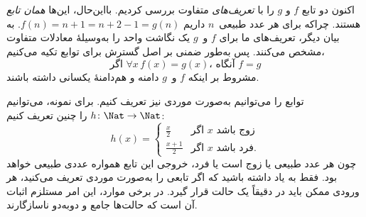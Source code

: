 \documentclass[../../../include/open-logic-section]{subfiles}
\begin{document}
\begin{explain}
اکنون دو تابع $f$ و $g$ را با \emph{تعریف‌های} متفاوت بررسی کردیم.
بااین‌حال، این‌ها \emph{همان تابع} هستند. چراکه
برای هر عدد طبیعی~$n$ داریم $f(n) = n+1 = n+2-1 =
g(n)$. به بیان دیگر، تعریف‌های ما برای $f$ و~$g$ یک
نگاشت واحد را به‌وسیلهٔ معادلات متفاوت مشخص می‌کنند. پس به‌طور ضمنی
بر اصل گسترش برای توابع تکیه می‌کنیم،
\[
  \text{اگر }\forall x\, f(x) = g(x)\text{، آنگاه }f = g
\]
مشروط بر اینکه $f$ و~$g$ دامنه و هم‌دامنهٔ یکسانی داشته باشند.
\end{explain}

\begin{ex}
توابع را می‌توانیم به‌صورت موردی نیز تعریف کنیم. برای نمونه، می‌توانیم
$h \colon \Nat \to \Nat$ را چنین تعریف کنیم:
\[
h(x) =
\begin{cases}
  \frac{x}{2} & \text{اگر $x$ زوج باشد} \\
  \frac{x+1}{2} & \text{اگر $x$ فرد باشد.}
\end{cases}
\]
چون هر عدد طبیعی یا زوج است یا فرد، خروجی این
تابع همواره عددی طبیعی خواهد بود. فقط به یاد داشته باشید که اگر
تابعی را به‌صورت موردی تعریف می‌کنید، هر ورودی ممکن باید در
دقیقاً یک حالت قرار گیرد. در برخی موارد، این امر مستلزم اثبات آن است که
حالت‌ها جامع و دوبه‌دو ناسازگارند.
\end{ex}
\end{document}
